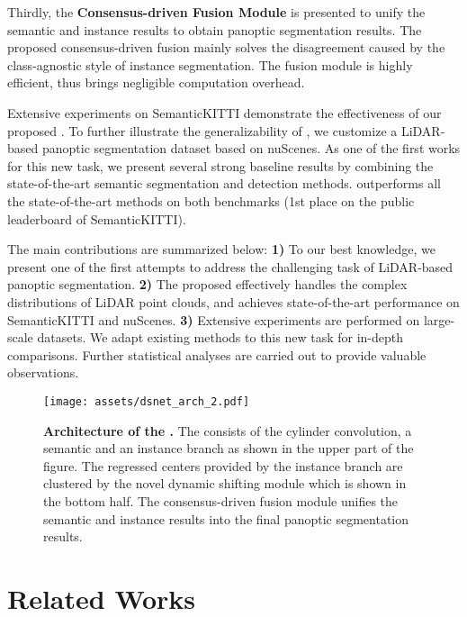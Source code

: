 \documentclass[final]{cvpr}
\begin{document}
Thirdly, the \textbf{Consensus-driven Fusion Module} is presented to unify the semantic and instance results
to obtain panoptic segmentation results.
The proposed consensus-driven fusion mainly solves the disagreement
caused by the class-agnostic style of instance segmentation.
The fusion module is highly efficient, thus brings negligible computation overhead.

Extensive experiments on SemanticKITTI demonstrate the effectiveness of our proposed \nickname{}.
To further illustrate the generalizability of \nickname{}, we customize a LiDAR-based panoptic
segmentation dataset based on nuScenes.
As one of the first works for this new task, we present several strong baseline results by combining
the state-of-the-art semantic segmentation and detection methods.
\nickname{} outperforms all the state-of-the-art methods on both benchmarks (1st place on the public leaderboard of SemanticKITTI).


The main contributions are summarized below: 
\textbf{1)} To our best knowledge, we present one of the first attempts to address the challenging task of LiDAR-based panoptic segmentation.
\textbf{2)} The proposed \nickname{} effectively handles the complex distributions of LiDAR point clouds, and achieves state-of-the-art performance on SemanticKITTI and nuScenes.
\textbf{3)} Extensive experiments are performed on large-scale datasets. We adapt existing methods to this new task for in-depth comparisons. Further statistical analyses are carried out to provide valuable observations.

 
\begin{figure*}[t]
    \vspace{-0.6cm}
    \begin{center}
\texttt{[image: assets/dsnet\_arch\_2.pdf]}
    \end{center}
    \vspace{-0.6cm}
    \caption{\textbf{Architecture of the \nickname{}.} The \nickname{} consists of the cylinder convolution, a semantic and an instance branch as shown in the upper part of the figure. The regressed centers provided by the instance branch are clustered by the novel dynamic shifting module which is shown in the bottom half. The consensus-driven fusion module unifies the semantic and instance results into the final panoptic segmentation results.}
    \label{fig:03_dsnet_arch}
    \vspace{-0.5cm}
\end{figure*} 
\section{Related Works}
\end{document}
